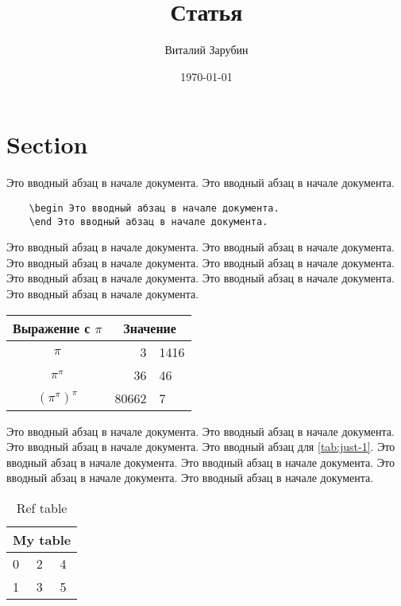 \documentclass[a4paper,12pt]{article}
\author{Виталий Зарубин}
\title{Статья}
\date{\today}
\begin{document}
    \maketitle

    \section{Section}

    Это вводный абзац в начале документа.
    Это вводный абзац в начале документа.

    \begin{verbatim}
    \begin Это вводный абзац в начале документа.
    \end Это вводный абзац в начале документа.
    \end{verbatim}

    Это вводный абзац в начале документа.
    Это вводный абзац в начале документа.
    Это вводный абзац в начале документа.
    Это вводный абзац в начале документа.
    Это вводный абзац в начале документа.
    Это вводный абзац в начале документа.
    Это вводный абзац в начале документа.

    \begin{center}
        \begin{tabular}{c r @{.} l}
            Выражение с $\pi$ &
            \multicolumn{2}{c}{Значение} \\
            \hline
            $\pi$
            & 3&1416 \\
            $\pi^{\pi}$
            & 36&46
            \\
            $(\pi^{\pi})^{\pi}$ & 80662&7 \\
        \end{tabular}
    \end{center}

    Это вводный абзац в начале документа.
    Это вводный абзац в начале документа.
    Это вводный абзац в начале документа.
    Это вводный абзац для \autoref{tab:just-1}. %
    Это вводный абзац в начале документа.
    Это вводный абзац в начале документа.
    Это вводный абзац в начале документа.
    Это вводный абзац в начале документа.

    \begin{table}[!ht]
        \begin{tabularx}{\textwidth}{|X|X|X|}
            \hline
            \multicolumn{3}{|c|}{My table}   \\ \hline
            0         & 2        & 4         \\ \hline
            1         & 3        & 5         \\ \hline
        \end{tabularx}
        \caption{Ref table}\label{tab:just-1}
    \end{table}
\end{document}
